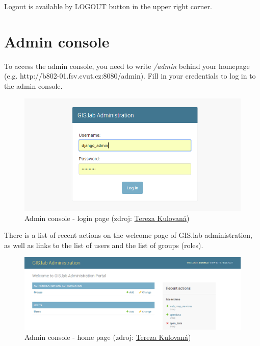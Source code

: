 Logout is available by \textsf{LOGOUT} button in the upper right
corner.

\section{Admin console}
\label{admin-console}

To access the admin console, you need to write \textit{/admin} behind
your homepage 
(e.g. http://b802-01.fsv.cvut.cz:8080/admin). Fill in your credentials
to log in to the admin console.
\begin{figure}[H] \centering
    \includegraphics[width=430pt]{./prilohy/guide-admin-home-unknown.png}
    \caption[Admin console - login page]{Admin console - login page (zdroj:
	\href{}{Tereza Kulovaná})}
	\label{fig:guide-admin-home-unknown}
\end{figure}

There is a list of recent actions on the welcome page of GIS.lab
administration, as well as links to the list of users and the list of
groups (roles).
\begin{figure}[H] \centering
    \includegraphics[width=430pt]{./prilohy/guide-admin-home-known.png}
    \caption[Admin console - home page]{Admin console - home page (zdroj:
	\href{}{Tereza Kulovaná})}
	\label{fig:guide-admin-home-known}
\end{figure}

